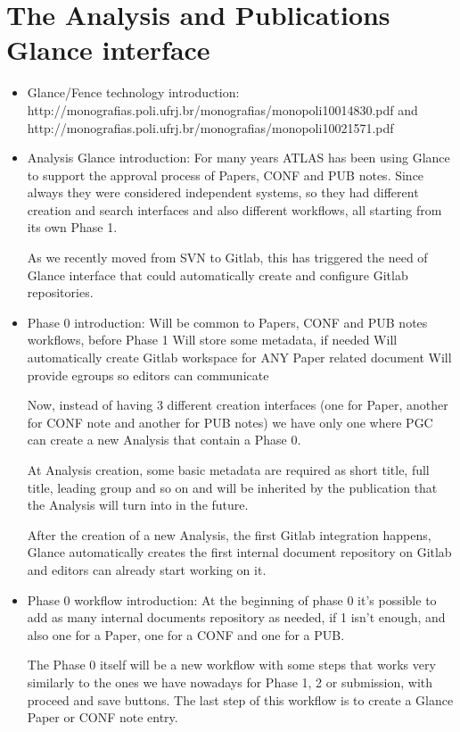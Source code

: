 \section{The Analysis and Publications Glance interface}%
\label{sec:anaglance}

\begin{itemize}
\item Glance/Fence technology introduction:
http://monografias.poli.ufrj.br/monografias/monopoli10014830.pdf and http://monografias.poli.ufrj.br/monografias/monopoli10021571.pdf

\item Analysis Glance introduction:
For many years ATLAS has been using Glance to support the approval process of Papers, CONF and PUB notes. Since always they were considered independent systems, so they had different creation and search interfaces and also different workflows, all starting from its own Phase 1.

As we recently moved from SVN to Gitlab, this has triggered the need of Glance interface that could automatically create and configure Gitlab repositories.

\item Phase 0 introduction:
Will be common to Papers, CONF and PUB notes workflows, before Phase 1
Will store some metadata, if needed
Will automatically create Gitlab workspace for ANY Paper related document
Will provide egroups so editors can communicate

Now, instead of having 3 different creation interfaces (one for Paper, another for CONF note and another for PUB notes) we have only one where PGC can create a new Analysis that contain a Phase 0.

At Analysis creation, some basic metadata are required as short title, full title, leading group and so on and will be inherited by the publication that the Analysis will turn into in the future.

After the creation of a new Analysis, the first Gitlab integration happens, Glance automatically creates the first internal document repository on Gitlab and editors can already start working on it.

\item Phase 0 workflow introduction:
At the beginning of phase 0 it's possible to add as many internal documents repository as needed, if 1 isn't enough, and also one for a Paper, one for a CONF and one for a PUB.

The Phase 0 itself will be a new workflow with some steps that works very similarly to the ones we have nowadays for Phase 1, 2 or submission, with proceed and save buttons. The last step of this workflow is to create a Glance Paper or CONF note entry.


\end{itemize}
